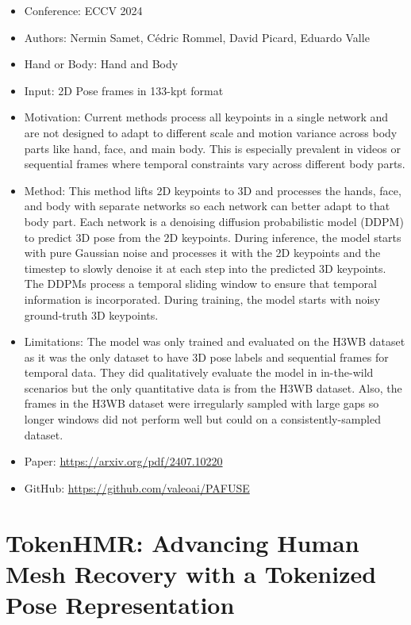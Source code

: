 \documentclass{article}
\begin{document}
\begin{itemize}
    \item Conference: ECCV 2024
    \item Authors: Nermin Samet, Cédric Rommel, David Picard, Eduardo Valle
    \item Hand or Body: Hand and Body
    \item Input: 2D Pose frames in 133-kpt format
    \item Motivation: Current methods process all keypoints in a single network and are not designed to adapt to different scale and motion variance across body parts like hand, face, and main body. This is especially prevalent in videos or sequential frames where temporal constraints vary across different body parts.
    \item Method: This method lifts 2D keypoints to 3D and processes the hands, face, and body with separate networks so each network can better adapt to that body part. Each network is a denoising diffusion probabilistic model (DDPM) to predict 3D pose from the 2D keypoints. During inference, the model starts with pure Gaussian noise and processes it with the 2D keypoints and the timestep to slowly denoise it at each step into the predicted 3D keypoints. The DDPMs process a temporal sliding window to ensure that temporal information is incorporated. During training, the model starts with noisy ground-truth 3D keypoints.
    \item Limitations: The model was only trained and evaluated on the H3WB dataset as it was the only dataset to have 3D pose labels and sequential frames for temporal data. They did qualitatively evaluate the model in in-the-wild scenarios but the only quantitative data is from the H3WB dataset. Also, the frames in the H3WB dataset were irregularly sampled with large gaps so longer windows did not perform well but could on a consistently-sampled dataset.
    \item Paper: \url{https://arxiv.org/pdf/2407.10220}
    \item GitHub: \url{https://github.com/valeoai/PAFUSE}
\end{itemize}

\section*{TokenHMR: Advancing Human Mesh Recovery with a Tokenized Pose Representation}
\end{document}
